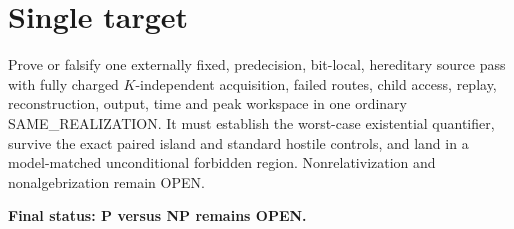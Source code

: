 \documentclass[11pt]{article}
\begin{document}
\section*{Single target}
Prove or falsify one externally fixed, predecision, bit-local, hereditary
source pass with fully charged $K$-independent acquisition, failed routes,
child access, replay, reconstruction, output, time and peak workspace in one
ordinary SAME\_REALIZATION.  It must establish the worst-case existential
quantifier, survive the exact paired island and standard hostile controls, and
land in a model-matched unconditional forbidden region.  Nonrelativization and
nonalgebrization remain OPEN.

\bigskip
\textbf{Final status: P versus NP remains OPEN.}

\end{document}
